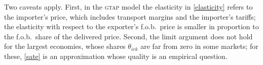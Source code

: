 \documentclass{jgea}
\newcommand{\SOE}{\textsc{soe}\xspace}
\newcommand{\SATE}{\textsc{sate}\xspace}
\newcommand{\GTAP}{\textsc{gtap}\xspace}
\begin{document}

Two caveats apply.
First, in the \GTAP model the elasticity in \eqref{elasticity} refers to the importer's price, which includes transport margins and the importer's tariffs; the elasticity with respect to the exporter's f.o.b.\ price is smaller in proportion to the f.o.b.\ share of the delivered price.
Second, the limit argument does not hold for the largest economies, whose shares $\theta_{irk}$ are far from zero in some markets; for these, \eqref{sate} is an approximation whose quality is an empirical question.
\end{document}

